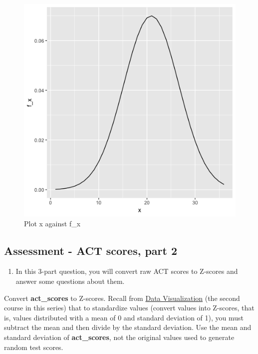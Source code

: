 \documentclass[
]{article}
\providecommand{\tightlist}{%
  \setlength{\itemsep}{0pt}\setlength{\parskip}{0pt}}
\begin{document}
\begin{figure}
\centering
\includegraphics{images/x_f_x_imageB.png}
\caption{Plot x against f\_x}
\end{figure}

\newpage

\hypertarget{assessment---act-scores-part-2}{%
\subsection{Assessment - ACT scores, part
2}\label{assessment---act-scores-part-2}}

\begin{enumerate}
\def\labelenumi{\arabic{enumi}.}
\setcounter{enumi}{2}
\tightlist
\item
  In this 3-part question, you will convert raw ACT scores to Z-scores
  and answer some questions about them.
\end{enumerate}

Convert \textbf{act\_scores} to Z-scores. Recall from
\href{https://www.edx.org/course/data-science-visualization}{Data
Visualization} (the second course in this series) that to standardize
values (convert values into Z-scores, that is, values distributed with a
mean of 0 and standard deviation of 1), you must subtract the mean and
then divide by the standard deviation. Use the mean and standard
deviation of \textbf{act\_scores}, not the original values used to
generate random test scores.
\end{document}
